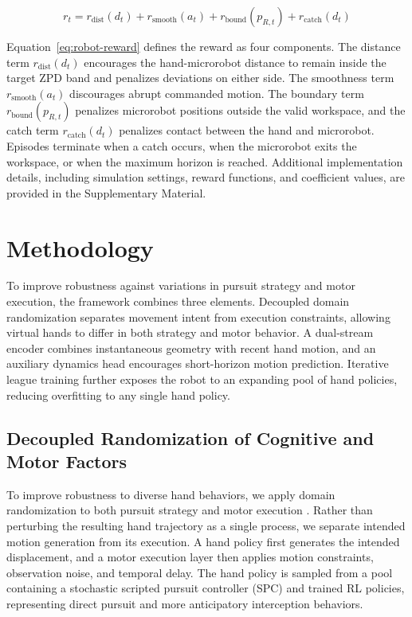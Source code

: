 \documentclass[lettersize,journal]{IEEEtran}
\begin{document}
\begin{equation}
r_t = r_{\mathrm{dist}}(d_t)
+ r_{\mathrm{smooth}}(a_t)
+ r_{\mathrm{bound}}(p_{R,t})
+ r_{\mathrm{catch}}(d_t)
\label{eq:robot-reward}
\end{equation}

Equation~\eqref{eq:robot-reward} defines the reward as four components. The distance term $r_{\mathrm{dist}}(d_t)$ encourages the hand-microrobot distance to remain inside the target ZPD band and penalizes deviations on either side. The smoothness term $r_{\mathrm{smooth}}(a_t)$ discourages abrupt commanded motion. The boundary term $r_{\mathrm{bound}}(p_{R,t})$ penalizes microrobot positions outside the valid workspace, and the catch term $r_{\mathrm{catch}}(d_t)$ penalizes contact between the hand and microrobot. Episodes terminate when a catch occurs, when the microrobot exits the workspace, or when the maximum horizon is reached. Additional implementation details, including simulation settings, reward functions, and coefficient values, are provided in the Supplementary Material.

\section{Methodology}
\label{sec:methodology}
To improve robustness against variations in pursuit strategy and motor execution, the framework combines three elements. Decoupled domain randomization separates movement intent from execution constraints, allowing virtual hands to differ in both strategy and motor behavior. A dual-stream encoder combines instantaneous geometry with recent hand motion, and an auxiliary dynamics head encourages short-horizon motion prediction. Iterative league training further exposes the robot to an expanding pool of hand policies, reducing overfitting to any single hand policy.

\subsection{Decoupled Randomization of Cognitive and Motor Factors}
\label{subsec:domain-randomization}
To improve robustness to diverse hand behaviors, we apply domain randomization to both pursuit strategy and motor execution \cite{tobinDomainRandomization2017,pengDynamicsRandomization2018,muratoreRandomizedSimulations2022,chebotarClosingSimReal2019,tiboniDROPO2023}. Rather than perturbing the resulting hand trajectory as a single process, we separate intended motion generation from its execution. A hand policy first generates the intended displacement, and a motor execution layer then applies motion constraints, observation noise, and temporal delay. The hand policy is sampled from a pool containing a stochastic scripted pursuit controller (SPC) and trained RL policies, representing direct pursuit and more anticipatory interception behaviors.
\end{document}
